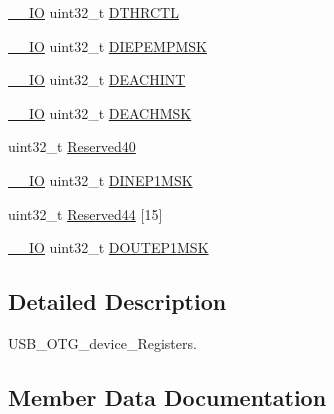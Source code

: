 \begin{DoxyCompactItemize}
\item 
\hyperlink{core__sc300_8h_aec43007d9998a0a0e01faede4133d6be}{\+\_\+\+\_\+\+IO} uint32\+\_\+t \hyperlink{struct_u_s_b___o_t_g___device_type_def_af0a7a07413a095432031eddc900031cd}{D\+T\+H\+R\+C\+TL}
\item 
\hyperlink{core__sc300_8h_aec43007d9998a0a0e01faede4133d6be}{\+\_\+\+\_\+\+IO} uint32\+\_\+t \hyperlink{struct_u_s_b___o_t_g___device_type_def_a6dca86482073d69a44c8e0e3a5efe068}{D\+I\+E\+P\+E\+M\+P\+M\+SK}
\item 
\hyperlink{core__sc300_8h_aec43007d9998a0a0e01faede4133d6be}{\+\_\+\+\_\+\+IO} uint32\+\_\+t \hyperlink{struct_u_s_b___o_t_g___device_type_def_a881208a5819f6a8bfb1f16a2d7cd05a1}{D\+E\+A\+C\+H\+I\+NT}
\item 
\hyperlink{core__sc300_8h_aec43007d9998a0a0e01faede4133d6be}{\+\_\+\+\_\+\+IO} uint32\+\_\+t \hyperlink{struct_u_s_b___o_t_g___device_type_def_ab10e5be5517065dccac3d098cc1b9894}{D\+E\+A\+C\+H\+M\+SK}
\item 
uint32\+\_\+t \hyperlink{struct_u_s_b___o_t_g___device_type_def_a4356045c881b1f037c3016473e580679}{Reserved40}
\item 
\hyperlink{core__sc300_8h_aec43007d9998a0a0e01faede4133d6be}{\+\_\+\+\_\+\+IO} uint32\+\_\+t \hyperlink{struct_u_s_b___o_t_g___device_type_def_a6dccbd3d18fe0e4e552aefc9f6f469fa}{D\+I\+N\+E\+P1\+M\+SK}
\item 
uint32\+\_\+t \hyperlink{struct_u_s_b___o_t_g___device_type_def_a6bb6a88a8d92f9cb65d104f40934844b}{Reserved44} \mbox{[}15\mbox{]}
\item 
\hyperlink{core__sc300_8h_aec43007d9998a0a0e01faede4133d6be}{\+\_\+\+\_\+\+IO} uint32\+\_\+t \hyperlink{struct_u_s_b___o_t_g___device_type_def_aabe0c08efd8c18aa1f85e4a38a3d2469}{D\+O\+U\+T\+E\+P1\+M\+SK}
\end{DoxyCompactItemize}


\subsection{Detailed Description}
U\+S\+B\+\_\+\+O\+T\+G\+\_\+device\+\_\+\+Registers. 

\subsection{Member Data Documentation}
